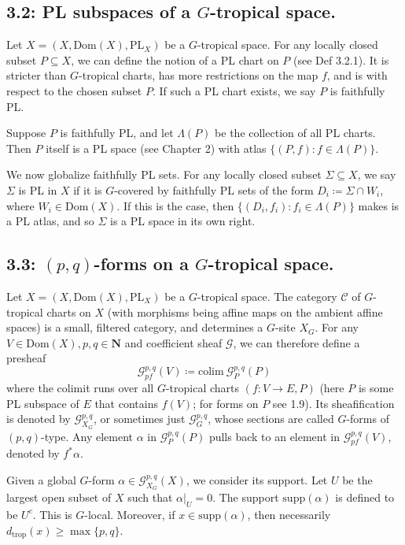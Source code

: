 \documentclass[12pt,reqno]{amsart}
\theoremstyle{definition}
\theoremstyle{remark}
\theoremstyle{citedrem}
\theoremstyle{cited}
\theoremstyle{citeddef}
\theoremstyle{step}
\begin{document}
\subsection*{3.2: PL subspaces of a $G$-tropical space.}
Let $X = (X, \mathrm{Dom}(X), \mathrm{PL}_X)$ be a $G$-tropical space. For any locally closed subset $P \subseteq X$, we can define the notion of a PL chart on $P$ (see Def 3.2.1). It is stricter than $G$-tropical charts, has more restrictions on the map $f$, and is with respect to the chosen subset $P$. If such a PL chart exists, we say $P$ is faithfully PL.

Suppose $P$ is faithfully PL, and let $\Lambda(P)$ be the collection of all PL charts. Then $P$ itself is a PL space (see Chapter 2) with atlas $\{(P, f) \colon f \in \Lambda(P)\}$.

We now globalize faithfully PL sets. For any locally closed subset $\Sigma \subseteq X$, we say $\Sigma$ is PL in $X$ if it is $G$-covered by faithfully PL sets of the form $D_i \coloneqq \Sigma \cap W_i$, where $W_i \in \mathrm{Dom}(X)$. If this is the case, then $\{(D_i, f_i) \colon f_i \in \Lambda(P)\}$ makes is a PL atlas, and so $\Sigma$ is a PL space in its own right. 

\subsection* {3.3: $(p,q)$-forms on a $G$-tropical space.}
Let $X = (X, \mathrm{Dom}(X), \mathrm{PL}_X)$ be a $G$-tropical space. The category $\mathcal{C}$ of $G$-tropical charts on $X$ (with morphisms being affine maps on the ambient affine spaces) is a small, filtered category, and determines a $G$-site $X_G$. For any $V \in \mathrm{Dom}(X), p, q \in \mathbf{N}$ and coefficient sheaf $\mathcal{G}$, we can therefore define a presheaf \[\mathcal{G}_{pf}^{p,q}(V) \coloneqq \mathrm{colim}\ \mathcal{G}_{P}^{p,q}(P)\] where the colimit runs over all $G$-tropical charts $(f\colon V \to E, P)$ (here $P$ is some PL subspace of $E$ that contains $f(V)$; for forms on $P$ see 1.9). Its sheafification is denoted by $\mathcal{G}_{X_G}^{p,q}$, or sometimes just $\mathcal{G}_G^{p,q}$, whose sections are called $G$-forms of $(p,q)$-type. Any element $\alpha$ in $\mathcal{G}^{p,q}_P(P)$ pulls back to an element in $\mathcal{G}^{p,q}_{pf}(V)$, denoted by $f^* \alpha$. 

Given a global $G$-form $\alpha \in \mathcal{G}_{X_G}^{p,q}(X)$, we consider its support. Let $U$ be the largest open subset of $X$ such that $\alpha|_{U} = 0$. The support $\mathrm{supp}(\alpha)$ is defined to be $U^c$. This is $G$-local. Moreover, if $x \in \mathrm{supp}(\alpha)$, then necessarily $d_{\mathrm{trop}}(x) \geq \max\{p,q\}$. 
\end{document}

